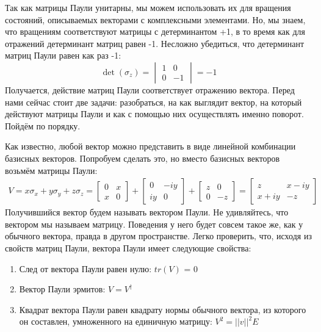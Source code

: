 Так как матрицы Паули унитарны, мы можем использовать их для вращения состояний, описываемых векторами с комплексными элементами. Но, мы знаем, что вращениям соответствуют матрицы с детерминантом +1, в то время как для отражений детерминант матриц равен -1. Несложно убедиться, что детерминант матриц Паули равен как раз -1:
\[
\det(\sigma_z) = \begin{vmatrix} 1 & 0 \\ 0 & -1 \end{vmatrix} = -1 
\]
Получается, действие матриц Паули соответствует отражению вектора. Перед нами сейчас стоит две задачи: разобраться, на как выглядит вектор, на который действуют матрицы Паули и как с помощью них осуществлять именно поворот. Пойдём по порядку.

Как известно, любой вектор можно представить в виде линейной комбинации базисных векторов. Попробуем сделать это, но вместо базисных векторов возьмём матрицы Паули:
\begin{align*}
V = x\sigma_x + y\sigma_y + z\sigma_z = \begin{bmatrix} 0 & x \\ x & 0 \end{bmatrix} + \begin{bmatrix} 0 & -iy \\ iy & 0 \end{bmatrix} + \begin{bmatrix} z & 0 \\ 0 & -z \end{bmatrix} = \begin{bmatrix} z & x-iy \\ x+iy & -z \end{bmatrix}
\end{align*}
Получившийся вектор будем называть вектором Паули. Не удивляйтесь, что вектором мы называем матрицу. Поведения у него будет совсем такое же, как у обычного вектора, правда в другом пространстве. Легко проверить, что, исходя из свойств матриц Паули, вектора Паули имеет следующие свойства:
\begin{enumerate}
    \item След от вектора Паули равен нулю: $tr(V)$ = 0
    \item Вектор Паули эрмитов: $V = V^{\dagger}$
    \item Квадрат вектора Паули равен квадрату нормы обычного вектора, из которого он составлен, умноженного на единичную матрицу: $V^2 = ||v||^2E$ 
\end{enumerate}

